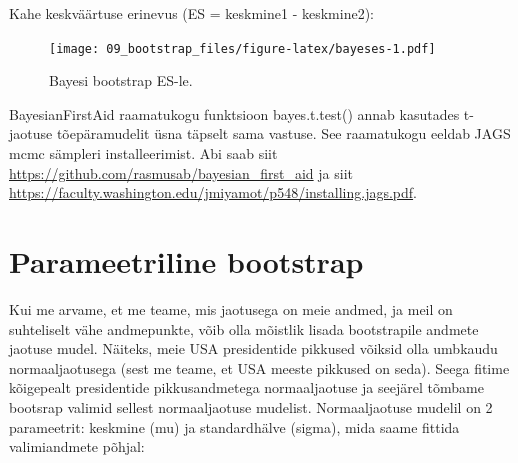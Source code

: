 \documentclass[]{book}
\newenvironment{Shaded}{\begin{snugshade}}{\end{snugshade}}
\newcommand{\KeywordTok}[1]{\textcolor[rgb]{0.13,0.29,0.53}{\textbf{#1}}}
\newcommand{\DataTypeTok}[1]{\textcolor[rgb]{0.13,0.29,0.53}{#1}}
\newcommand{\DecValTok}[1]{\textcolor[rgb]{0.00,0.00,0.81}{#1}}
\newcommand{\StringTok}[1]{\textcolor[rgb]{0.31,0.60,0.02}{#1}}
\newcommand{\OtherTok}[1]{\textcolor[rgb]{0.56,0.35,0.01}{#1}}
\newcommand{\OperatorTok}[1]{\textcolor[rgb]{0.81,0.36,0.00}{\textbf{#1}}}
\newcommand{\NormalTok}[1]{#1}
\begin{document}
Kahe keskväärtuse erinevus (ES = keskmine1 - keskmine2):



\begin{Shaded}
\end{Shaded}

\begin{figure}
\centering
\texttt{[image: 09\_bootstrap\_files/figure-latex/bayeses-1.pdf]}
\caption{\label{fig:bayeses}Bayesi bootstrap ES-le.}
\end{figure}

BayesianFirstAid raamatukogu funktsioon bayes.t.test() annab kasutades
t-jaotuse tõepäramudelit üsna täpselt sama vastuse. See raamatukogu
eeldab JAGS mcmc sämpleri installeerimist. Abi saab siit
\url{https://github.com/rasmusab/bayesian_first_aid} ja siit
\url{https://faculty.washington.edu/jmiyamot/p548/installing.jags.pdf}.

\section*{Parameetriline bootstrap}\label{parameetriline-bootstrap}

Kui me arvame, et me teame, mis jaotusega on meie andmed, ja meil on
suhteliselt vähe andmepunkte, võib olla mõistlik lisada bootstrapile
andmete jaotuse mudel. Näiteks, meie USA presidentide pikkused võiksid
olla umbkaudu normaaljaotusega (sest me teame, et USA meeste pikkused on
seda). Seega fitime kõigepealt presidentide pikkusandmetega
normaaljaotuse ja seejärel tõmbame bootsrap valimid sellest
normaaljaotuse mudelist. Normaaljaotuse mudelil on 2 parameetrit:
keskmine (mu) ja standardhälve (sigma), mida saame fittida valimiandmete
põhjal:
\end{document}
